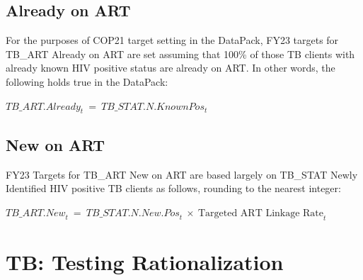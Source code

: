 \documentclass[
  openany]{book}
\begin{document}
\hypertarget{already-on-art}{%
\subsection{Already on ART}\label{already-on-art}}

For the purposes of COP21 target setting in the DataPack, FY23 targets
for TB\_ART Already on ART are set assuming that 100\% of those TB clients
with already known HIV positive status are already on ART. In other
words, the following holds true in the DataPack:

\begin{center} ${TB\_ ART.Already}_{t}\  = \ {TB\_ STAT.N.KnownPos}_{t}$ \end{center}

\hypertarget{new-on-art}{%
\subsection{New on ART}\label{new-on-art}}

FY23 Targets for TB\_ART New on ART are based largely on TB\_STAT Newly
Identified HIV positive TB clients as follows, rounding to the nearest
integer:

\begin{center} ${TB\_ ART.New}_{t}\  = \ {TB\_ STAT.N.New.Pos}_{t}\  \times \ \text{Targeted ART Linkage Rate}_{t}$ \end{center}

\hypertarget{tb-testing-rationalization}{%
\section{TB: Testing Rationalization}\label{tb-testing-rationalization}}
\end{document}
